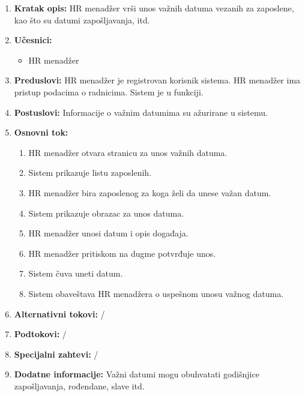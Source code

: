\documentclass[a4paper]{article}
\begin{document}
\begin{enumerate}
    \item \textbf{Kratak opis:} HR menadžer vrši unos važnih datuma vezanih za zaposlene, kao što su datumi zapošljavanja, itd.
    \item \textbf{Učesnici:}
        \begin{itemize}
            \item HR menadžer
        \end{itemize}
    \item \textbf{Preduslovi:} HR menadžer je registrovan korisnik sistema. HR menadžer ima pristup podacima o radnicima. Sistem je u funkciji.
    \item \textbf{Postuslovi:} Informacije o važnim datumima su ažurirane u sistemu.
    \item \textbf{Osnovni tok:}
        \begin{enumerate}
            \item HR menadžer otvara stranicu za unos važnih datuma.
            \item Sistem prikazuje listu zaposlenih.
            \item HR menadžer bira zaposlenog za koga želi da unese važan datum.
            \item Sistem prikazuje obrazac za unos datuma.
            \item HR menadžer unosi datum i opis događaja.
            \item HR menadžer pritiskom na dugme potvrđuje unos.
            \item Sistem čuva uneti datum.
            \item Sistem obaveštava HR menadžera o uspešnom unosu važnog datuma.
        \end{enumerate}
    \item \textbf{Alternativni tokovi:} /
    \item \textbf{Podtokovi:} /
    \item \textbf{Specijalni zahtevi:} /
    \item \textbf{Dodatne informacije:} Važni datumi mogu obuhvatati godišnjice zapošljavanja, rođendane, slave itd.
\end{enumerate}
\end{document}
